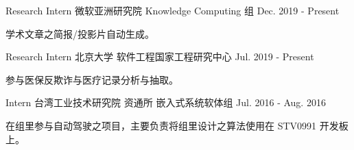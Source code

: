 

\begin{cventries}

  \cventry
    {Research Intern} %
    {微软亚洲研究院 Knowledge Computing 组} %
    {} %
    {Dec. 2019 - Present} %
    {
      \begin{cvitems} %
        \item {学术文章之简报/投影片自动生成。}
      \end{cvitems}
    }

  \cventry
    {Research Intern} %
    {北京大学 软件工程国家工程研究中心} %
    {} %
    {Jul. 2019 - Present} %
    {
      \begin{cvitems} %
        \item {参与医保反欺诈与医疗记录分析与抽取。}
      \end{cvitems}
    }

  \cventry
    {Intern} %
    {台湾工业技术研究院 资通所 嵌入式系统软体组} %
    {} %
    {Jul. 2016 - Aug. 2016} %
    {
      \begin{cvitems} %
        \item {在组里参与自动驾驶之项目，主要负责将组里设计之算法使用在 STV0991 开发板上。}
      \end{cvitems}
    }

\end{cventries}
